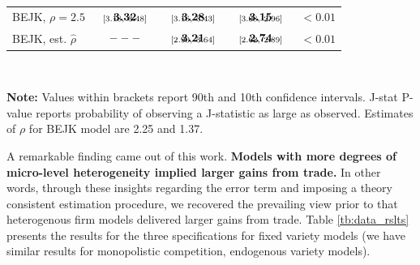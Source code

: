 \documentclass[pdftex,12pt]{article}
\begin{document}
\begin{table}[!h]
\begin{center}
\begin{tabular}[t]{l c c c c }
BEJK, $\rho = 2.5$            & $\begin{array}{c}{\textbf{3.32}} \vspace{-.4cm}\\ \scriptstyle{[3.18,   \ 3.48]}\end{array}$ &  $\begin{array}{c}{\textbf{3.28}} \vspace{-.4cm}\\ \scriptstyle{[3.16,   \ 3.43]}\end{array}$   &  $\begin{array}{c}{\textbf{3.15}} \vspace{-.4cm}\\ \scriptstyle{[3.08,   \ 2.96]}\end{array}$  & $< 0.01$          \\
BEJK, est. $\hat{\rho}$            & $\begin{array}{c}{---} \vspace{-.4cm}\\ \scriptstyle{}\end{array}$ &  $\begin{array}{c}{\textbf{3.21}} \vspace{-.4cm}\\ \scriptstyle{[2.90,   \ 3.64]}\end{array}$   &  $\begin{array}{c}{\textbf{2.74}} \vspace{-.4cm}\\ \scriptstyle{[2.62,   \ 2.89]}\end{array}$   & $< 0.01$          \\
\hline
\end{tabular}
\\[0.75ex]
\parbox{5.7in}{\footnotesize \textbf{Note:} Values within brackets report 90th and 10th confidence intervals. J-stat P-value reports probability of observing a J-statistic as large as observed. Estimates of $\rho$ for BEJK model are 2.25 and 1.37.}
\end{center}
\end{table}

A remarkable finding came out of this work. \textbf{Models with more degrees of micro-level heterogeneity implied larger gains from trade.} In other words, through these insights regarding the error term and imposing a theory consistent estimation procedure, we recovered the prevailing view prior to \citet{arkolakis2012new} that heterogenous firm models delivered larger gains from trade. Table \ref{tb:data_rslts} presents the results for the three specifications for fixed variety models (we have similar results for monopolistic competition, endogenous variety models).
\end{document}
